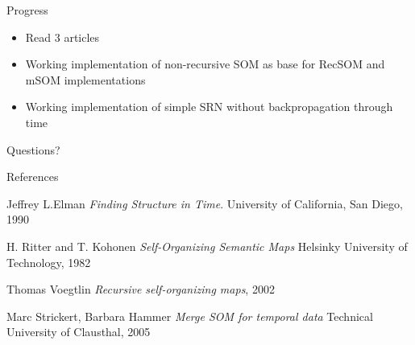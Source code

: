 \documentclass[10pt]{beamer}
\begin{document}
\begin{frame}{Progress}

\begin{itemize}
\item Read 3 articles
\item Working implementation of non-recursive SOM as base for RecSOM and mSOM implementations
\item Working implementation of simple SRN without backpropagation through time
\end{itemize}

\end{frame}


{
\begin{frame}[standout]
  Questions?
\end{frame}
}

\appendix


\begin{frame}[allowframebreaks]{References}

  
  
  
\begin{thebibliography}{9}
Jeffrey L.Elman
\textit{Finding Structure in Time}. 
University of California, San Diego, 1990
 
H. Ritter and T. Kohonen
\textit{Self-Organizing Semantic Maps} 
Helsinky University of Technology, 1982
  
Thomas Voegtlin
\textit{Recursive self-organizing maps}, 2002
 
Marc Strickert, Barbara Hammer
\textit{Merge SOM for temporal data}
Technical University of Clausthal, 2005
 
\end{thebibliography}

\end{frame}
\end{document}
